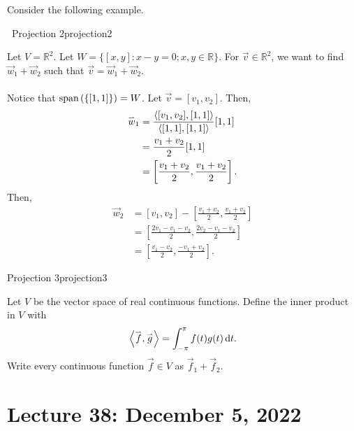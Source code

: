         \pagebreak
        \vphantom
        \\
        \\
        Consider the following example.
        \begin{example}{\Difficulty\,\Difficulty\,\,Projection 2}{projection2}

            Let \(V=\mathbb{R}^2\). Let \(W=\{[x,y]:x-y=0;x,y\in\mathbb{R}\}\). For \(\vec{v}\in\mathbb{R}^2\), we want to find \(\vec{w}_1+\vec{w}_2\) such that \(\vec{v}=\vec{w}_1+\vec{w}_2\).
            \\
            \\
            Notice that \(\text{span\,}(\{[1,1]\})=W\). Let \(\vec{v}=[v_1,v_2]\). Then,
            \begin{align*}
                \overset{_{\rightharpoonup}}{w}_1&=\frac{\left\langle [v_1,v_2],[1,1]\right\rangle}{\left\langle [1,1],[1,1]\right\rangle}[1,1] \\
                &=\frac{v_1+v_2}{2}[1,1] \\
                &=\left[\frac{v_1+v_2}{2},\frac{v_1+v_2}{2}\right].
            \end{align*}
            Then,
            \begin{align*}
                \vec{w}_2&=[v_1,v_2]-\left[\frac{v_1+v_2}{2},\frac{v_1+v_2}{2}\right] \\
                &=\left[\frac{2v_1-v_1-v_2}{2},\frac{2v_2-v_1-v_2}{2}\right] \\
                &=\left[\frac{v_1-v_2}{2},\frac{-v_1+v_2}{2}\right].
            \end{align*}
            
        \end{example}
        \begin{example}{Projection 3}{projection3}

            Let \(V\) be the vector space of real continuous functions. Define the inner product in \(V\) with
            \begin{equation*}
                \left\langle \overset{_{\rightharpoonup}}{f},\overset{_{\rightharpoonup}}{g}\right\rangle=\int_{-\pi}^\pi f(t)g(t) \,\text{d} t.
            \end{equation*}
            Write every continuous function \(\vec{f}\in V\) as \(\vec{f}_1+\vec{f}_2\).
            
        \end{example}

\pagebreak

\section{Lecture 38: December 5, 2022}

